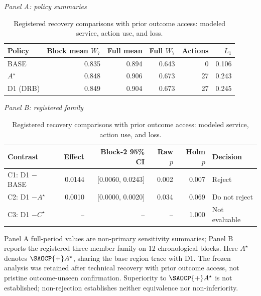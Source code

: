 
\begin{table}[!tbp]
\centering
\caption{Registered recovery comparisons with prior outcome access:
modeled service, action use, and loss.}
\label{tab:recovery}
\scriptsize
\setlength{\tabcolsep}{3pt}
\textit{Panel A: policy summaries}\\[2pt]
\begin{tabular}{lrrrrr}
\toprule
Policy & Block mean $W_7$ & Full mean & Full $W_7$ & Actions & $L_1$ \\
\midrule
BASE & 0.835 & 0.894 & 0.643 & 0 & 0.106 \\
$A^\star$ & 0.848 & 0.906 & 0.673 & 27 & 0.243 \\
D1 (DRB) & 0.849 & 0.904 & 0.673 & 27 & 0.245 \\
\bottomrule
\end{tabular}

\vspace{5pt}
\textit{Panel B: registered family}\\[2pt]
\begin{tabular}{lrrrrl}
\toprule
Contrast & Effect & Block-2 95\% CI & Raw $p$ & Holm $p$ & Decision \\
\midrule
C1: D1 $-$ BASE & 0.0144 & [0.0060, 0.0243] & 0.002 & 0.007 & Reject \\
C2: D1 $- A^\star$ & 0.0010 & [0.0000, 0.0020] & 0.034 & 0.069 & Do not reject \\
C3: D1 $- C^\star$ & -- & -- & -- & 1.000 & Not evaluable \\
\bottomrule
\end{tabular}
\par\footnotesize Panel A full-period values are non-primary sensitivity summaries; Panel B reports the registered three-member family on 12 chronological blocks. Here $A^\star$ denotes $\SAOCP{+}A^\star$, sharing the base region trace with D1. The frozen analysis was retained after technical recovery with prior outcome access, not pristine outcome-unseen confirmation. Superiority to $\SAOCP{+}A^\star$ is not established; non-rejection establishes neither equivalence nor non-inferiority.
\end{table}
